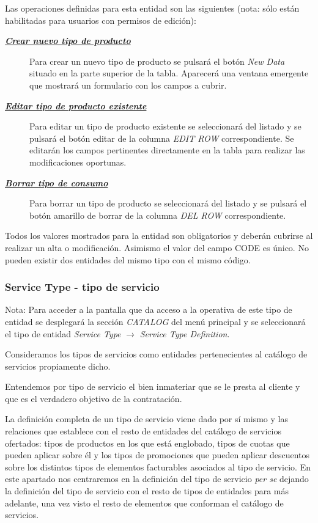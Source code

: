 Las operaciones definidas para esta entidad son las siguientes (nota: sólo están habilitadas para usuarios con permisos de edición):
\begin{description}
\item[\underline{\textsl{\textbf{Crear nuevo tipo de producto}}}] Para crear un nuevo tipo de producto se pulsará el botón \textit{New Data} situado en la parte superior de la tabla. Aparecerá una ventana emergente que mostrará un formulario con los campos a cubrir.

\item[\underline{\textsl{\textbf{Editar tipo de producto existente}}}] Para editar un tipo de producto existente se seleccionará del listado y se pulsará el botón editar de la columna \textit{EDIT ROW} correspondiente. Se editarán los campos pertinentes directamente en la tabla para realizar las modificaciones oportunas. 

\item[\underline{\textsl{\textbf{Borrar tipo de consumo}}}] Para borrar un tipo de producto se seleccionará del listado y se pulsará el botón amarillo de borrar de la columna \textit{DEL ROW} correspondiente.
\end{description}

Todos los valores mostrados para la entidad son obligatorios y deberán cubrirse al realizar un alta o modificación. Asimismo el valor del campo CODE es único. No pueden existir dos entidades del mismo tipo con el mismo código.




\subsubsection{Service Type - tipo de servicio}
\label{sub:service-type}

Nota: Para acceder a la pantalla que da acceso a la operativa de este tipo de entidad se desplegará la sección \emph{CATALOG} del menú principal y se seleccionará el tipo de entidad \emph{Service Type} $\rightarrow$  \emph{Service Type Definition}.

Consideramos los tipos de servicios como entidades pertenecientes al catálogo de servicios propiamente dicho.

Entendemos por tipo de servicio el bien inmateriar que se le presta al cliente y que es el verdadero objetivo de la contratación.

La definición completa de un tipo de servicio viene dado por sí mismo y las relaciones que establece con el resto de entidades del catálogo de servicios ofertados: tipos de productos en los que está englobado, tipos de cuotas que pueden aplicar sobre él y los tipos de promociones que pueden aplicar descuentos sobre los distintos tipos de elementos facturables asociados al tipo de servicio. En este apartado nos centraremos en la definición del tipo de servicio \textit{per se} dejando la definición del tipo de servicio con el resto de tipos de entidades para más adelante, una vez visto el resto de elementos que conforman el catálogo de servicios.

